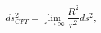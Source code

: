 \begin{equation}
ds_{CFT}^2=\lim_{r \rightarrow \infty}\frac{R^2}{r^2}ds^2 ,
\label{euniverse}
\end{equation}


